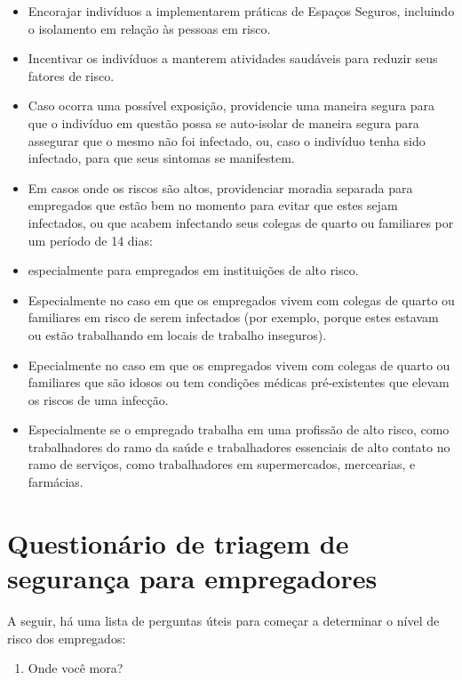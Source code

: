 \documentclass[onecolumn,journal]{IEEEtran}
\begin{document}
\begin{multicols}{2}
\begin{itemize}
\item Encorajar indivíduos a implementarem práticas de Espaços Seguros, incluindo o isolamento em relação às pessoas em risco.
\item Incentivar os indivíduos a manterem atividades saudáveis para reduzir seus fatores de risco.
\item Caso ocorra uma possível exposição, providencie uma maneira segura para que o indivíduo em questão possa se auto-isolar de maneira segura para assegurar que o mesmo não foi infectado, ou, caso o indivíduo  tenha sido infectado, para que seus sintomas se manifestem.
\item Em casos onde os riscos são altos, providenciar moradia separada para empregados que estão bem no momento para evitar que estes sejam infectados, ou que acabem infectando seus colegas de quarto ou familiares por um período de 14 dias:
\end{itemize}

  \begin{itemize}
  \tightlist
  \item especialmente para empregados em instituições de alto risco.
  \item Especialmente no caso em que os empregados vivem com colegas de quarto ou familiares em risco de serem infectados (por exemplo, porque estes estavam ou estão trabalhando em locais de trabalho inseguros).
  \item Epecialmente no caso em que os empregados vivem com colegas de quarto ou familiares que são idosos ou tem condições médicas pré-existentes que elevam os riscos de uma infecção.
  \item Especialmente se o empregado trabalha em uma profissão de alto risco, como trabalhadores do ramo da saúde e trabalhadores essenciais de alto contato no ramo de serviços, como trabalhadores em supermercados, mercearias, e farmácias.
  \end{itemize}

\section*{Questionário de triagem de segurança para
empregadores}

A seguir, há uma lista de perguntas úteis para começar a determinar o nível de risco dos empregados:

\begin{enumerate}
\def\labelenumi{\arabic{enumi}.}
\tightlist
\item Onde você mora?


\end{enumerate}
\end{multicols}
\end{document}
